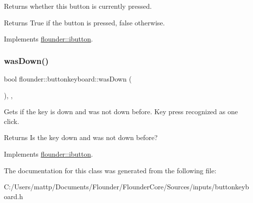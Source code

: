 Returns whether this button is currently pressed. 

\begin{DoxyReturn}{Returns}
True if the button is pressed, false otherwise. 
\end{DoxyReturn}


Implements \hyperlink{classflounder_1_1ibutton_ab64fd22a75ea66ce67fd9b1ad34fd837}{flounder\+::ibutton}.

\mbox{\label{classflounder_1_1buttonkeyboard_abc6b3c8cf9398f2a896408e390fd3a01}} 
\subsubsection{\texorpdfstring{was\+Down()}{wasDown()}}
{\footnotesize\ttfamily bool flounder\+::buttonkeyboard\+::was\+Down (\begin{DoxyParamCaption}{ }\end{DoxyParamCaption})\hspace{0.3cm}{\ttfamily [inline]}, {\ttfamily [override]}, {\ttfamily [virtual]}}



Gets if the key is down and was not down before. Key press recognized as one click. 

\begin{DoxyReturn}{Returns}
Is the key down and was not down before? 
\end{DoxyReturn}


Implements \hyperlink{classflounder_1_1ibutton_a5fb7b3493c0ea0e67bb9defc272da0d3}{flounder\+::ibutton}.



The documentation for this class was generated from the following file\+:\begin{DoxyCompactItemize}
\item 
C\+:/\+Users/mattp/\+Documents/\+Flounder/\+Flounder\+Core/\+Sources/inputs/buttonkeyboard.\+h\end{DoxyCompactItemize}
